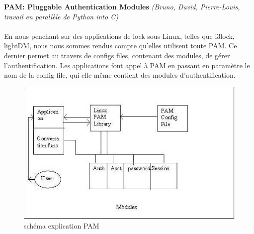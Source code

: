 \documentclass[french]{report}
\begin{document}
  \vspace{0.5cm}
\newpage
  \textbf{PAM: Pluggable Authentication Modules} \emph{(Bruno, David,
  Pierre-Louis, travail en parallèle de Python into C)}\\\\
En nous penchant sur des applications de lock sous Linux, telles que i3lock,
lightDM, nous nous sommes rendus compte qu’elles utilisent toute PAM.
Ce dernier permet au travers de configs files, contenant des modules, de
gérer l’authentification. Les applications font appel à PAM en passant en
paramètre le nom de la config file, qui elle même contient des modules
d’authentification.

  \begin{figure}[h]
    \begin{center}
    \includegraphics[width=0.8\linewidth]{pam}
    \caption{schéma explication PAM}
  \end{center}
  \end{figure}
\end{document}
